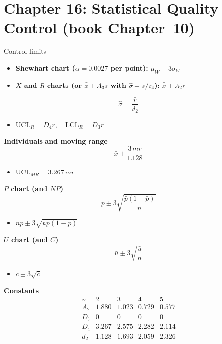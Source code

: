 \section{Chapter 16: Statistical Quality Control (book Chapter~10)}

\begin{formulabox}{Control limits}
\begin{itemize}
  \item \textbf{Shewhart chart ($\alpha=0.0027$ per point):} $\mu_W\pm3\sigma_W$
  \item \textbf{$\bar{X}$ and $R$ charts (or $\bar{\bar{x}}\pm A_3\bar{s}$ with $\hat\sigma=\bar{s}/c_4$):} $\bar{\bar{x}}\pm A_2\bar{r}$
\end{itemize}
\[ \hat\sigma=\frac{\bar{r}}{d_2} \]
\begin{itemize}
  \item $\mathrm{UCL}_R=D_4\bar{r},\quad \mathrm{LCL}_R=D_3\bar{r}$
\end{itemize}
\textbf{Individuals and moving range}
\[ \bar{x}\pm\frac{3\,\overline{mr}}{1.128} \]
\begin{itemize}
  \item $\mathrm{UCL}_{MR}=3.267\,\overline{mr}$
\end{itemize}
\textbf{$P$ chart (and $NP$)}
\[ \bar{p}\pm3\sqrt{\frac{\bar{p}(1-\bar{p})}{n}} \]
\begin{itemize}
  \item $n\bar{p}\pm3\sqrt{n\bar{p}(1-\bar{p})}$
\end{itemize}
\textbf{$U$ chart (and $C$)}
\[ \bar{u}\pm3\sqrt{\frac{\bar{u}}{n}} \]
\begin{itemize}
  \item $\bar{c}\pm3\sqrt{\bar{c}}$
\end{itemize}
\textbf{Constants}
\[ \begin{array}{c|cccc}n&2&3&4&5\\\hline A_2&1.880&1.023&0.729&0.577\\D_3&0&0&0&0\\D_4&3.267&2.575&2.282&2.114\\d_2&1.128&1.693&2.059&2.326\end{array} \]
\end{formulabox}

